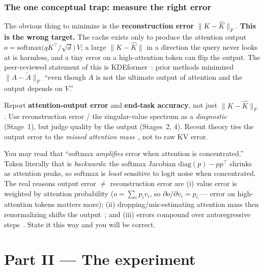 \documentclass[11pt]{article}
\newcommand{\term}[1]{\textbf{\color{accent!85!black}#1}}
\begin{document}
\section{The one conceptual trap: measure the right error}

The obvious thing to minimize is the \term{reconstruction error} $\lVert K-\hat K\rVert_F$.
\textbf{This is the wrong target.} The cache exists only to produce the attention output
$o=\mathrm{softmax}\!\big(qK^\top/\sqrt d\big)\,V$; a large $\lVert K-\hat K\rVert$ in a direction
the query never looks at is harmless, and a tiny error on a high-attention token can flip the
output. The peer-reviewed statement of this is KDEformer~\cite{kdeformer}: prior methods
minimized $\lVert A-\tilde A\rVert_F$ ``even though $A$ is not the ultimate output of attention
and the output depends on $V$.''

\begin{keybox}
Report \textbf{attention-output error} and \textbf{end-task accuracy}, not just
$\lVert K-\hat K\rVert_F$. Use reconstruction error / the singular-value spectrum as a
\emph{diagnostic} (Stage~1), but judge quality by the output (Stages~2, 4). Recent theory ties
the output error to the \emph{missed attention mass}~\cite{tvattn,adakv}, not to raw KV error.
\end{keybox}

\begin{pitfall}
You may read that ``softmax \emph{amplifies} error when attention is concentrated.'' Taken
literally that is \emph{backwards}: the softmax Jacobian $\mathrm{diag}(p)-pp^\top$ shrinks as
attention peaks, so softmax is \emph{least} sensitive to logit noise when concentrated. The real
reasons output error $\neq$ reconstruction error are (i) value error is weighted by attention
probability ($o=\sum_i p_i v_i$, so $\partial o/\partial v_i = p_i$ --- error on high-attention
tokens matters more); (ii) dropping/mis-estimating attention mass then renormalizing shifts the
output~\cite{tvattn}; and (iii) errors compound over autoregressive steps~\cite{gear}. State it
this way and you will be correct.
\end{pitfall}

\part*{Part II \;---\; The experiment}
\end{document}
